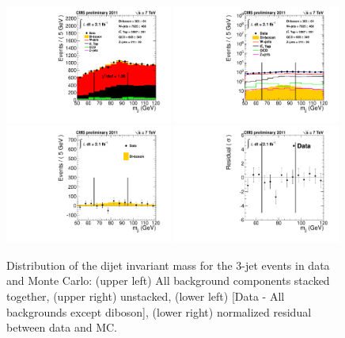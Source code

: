 \begin{figure}[h!t]
  {\centering
    \includegraphics[width=0.49\textwidth]{plots/kalanand_3jetsample/mJJ_Stacked.pdf}
    \includegraphics[width=0.49\textwidth]{plots/kalanand_3jetsample/mJJ-combined-fit-logY-truncated.pdf}
    \includegraphics[width=0.49\textwidth]{plots/kalanand_3jetsample/mJJ-combined-fit-subtracted-truncated.pdf}
    \includegraphics[width=0.49\textwidth]{plots/kalanand_3jetsample/mJJ-combined-fit-residual-truncated.pdf}

    \caption{Distribution of the dijet invariant mass for the 3-jet events in data and Monte Carlo: 
      (upper left) All background components stacked together, 
      (upper right) unstacked, (lower left) [Data -  All backgrounds except diboson],  
      (lower right) normalized residual between data and MC.}
    \label{fig:mjj_3jet}}
\end{figure}
